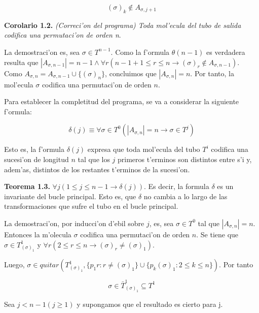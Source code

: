 \documentclass[12pt]{article}
\begin{document}
\begin{equation*}
    (\sigma)_{k} \notin A_{\sigma,j+1}
\end{equation*}

\textbf{Corolario 1.2.} \textit{(Correci'on del programa) Toda mol'ecula del tubo de salida codifica una permutaci'on de
orden n}.

La demostraci'on es, sea $\sigma \in T^{n-1}$. Como la f'ormula $\theta(n-1)$ es verdadera resulta que
$|A_{\sigma,n-1}| = n - 1 \land \forall r (n - 1 + 1 \leq r \leq n \longrightarrow (\sigma)_{r} \notin A_{\sigma,n-1})$.
Como $A_{\sigma,n} = A_{\sigma,n-1} \cup \{(\sigma)_{n}\}$, concluimos que $|A_{\sigma,n}| = n$. Por tanto, la mol'ecula
$\sigma$ codifica una permutaci'on de orden $n$.

Para establecer la completitud del programa, se va a considerar la siguiente f'ormula:

\begin{equation*}
  \delta(j) \equiv \forall \sigma \in T^{0} (|A_{\sigma,n}| = n \longrightarrow \sigma \in T^{j})
\end{equation*}

Esto es, la f'ormula $\delta(j)$ expresa que toda mol'ecula del tubo $T^{i}$ codifica una sucesi'on de longitud $n$ tal que
los $j$ primeros t'erminos son distintos entre s'i y, adem'as, distintos de los restantes t'erminos de la sucesi'on.

\textbf{Teorema 1.3.} $\forall j (1 \leq j \leq n-1 \longrightarrow \delta(j))$. Es decir, la formula $\delta$ es un invariante del
bucle principal. Esto es, que $\delta$ no cambia a lo largo de las transformaciones que sufre el tubo en el bucle principal.

La demostraci'on, por inducci'on d'ebil sobre $j$, es, sea $\sigma \in  T^{0}$ tal que $|A_{\sigma,n}| = n$. Entonces
la m'olecula $\sigma$ codifica una permutaci'on de orden $n$. Se tiene que $\sigma \in T_{(\sigma)_{1}}^{1}$ y
$\forall r (2 \leq r \leq n \longrightarrow (\sigma)_{r} \neq (\sigma)_{1})$.

Luego, $\sigma \in quitar(T_{(\sigma)_{1}}^{1}, \{p_{1}r : r \neq (\sigma)_{1}\} \cup \{p_{k}(\sigma)_{1} : 2 \leq k \leq n\})$.
Por tanto

\begin{equation*}
  \sigma \in \bar{T}_{(\sigma)_{1}}^{1} \subseteq T^{1}
\end{equation*}

Sea $j < n - 1 (j \geq 1)$ y supongamos que el resultado es cierto para j.
\end{document}
